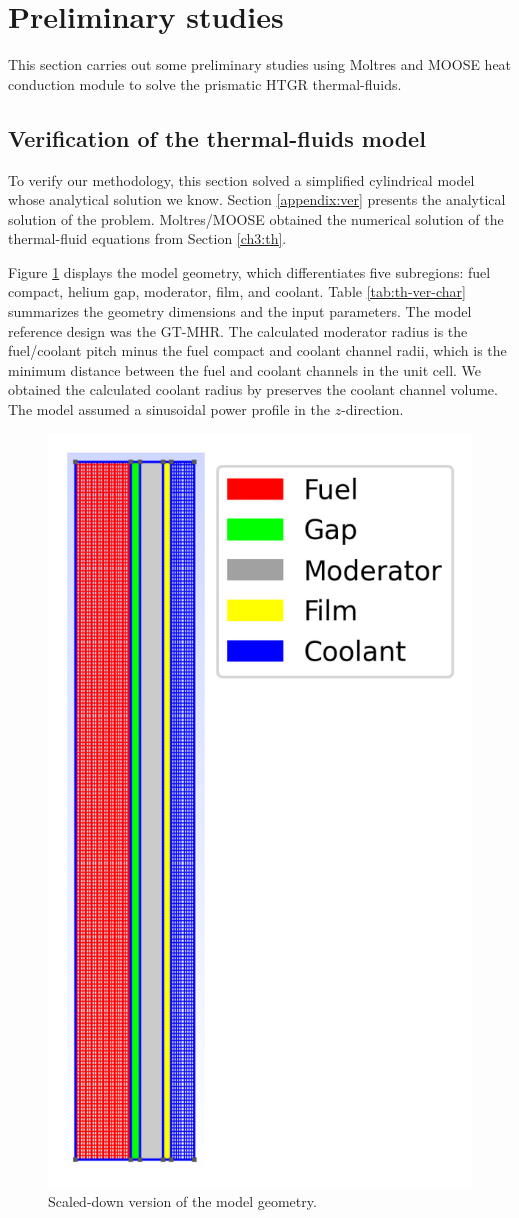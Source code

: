 \section{Preliminary studies}

This section carries out some preliminary studies using Moltres and MOOSE heat conduction module to solve the prismatic HTGR thermal-fluids.

\subsection{Verification of the thermal-fluids model}

To verify our methodology, this section solved a simplified cylindrical model whose analytical solution we know.
Section \ref{appendix:ver} presents the analytical solution of the problem.
Moltres/MOOSE obtained the numerical solution of the thermal-fluid equations from Section \ref{ch3:th}.

Figure \ref{fig:th-ver-mesh} displays the model geometry, which differentiates five subregions: fuel compact, helium gap, moderator, film, and coolant.
Table \ref{tab:th-ver-char} summarizes the geometry dimensions and the input parameters.
The model reference design was the GT-MHR.
The calculated moderator radius is the fuel/coolant pitch minus the fuel compact and coolant channel radii, which is the minimum distance between the fuel and coolant channels in the unit cell.
We obtained the calculated coolant radius by preserves the coolant channel volume.
The model assumed a sinusoidal power profile in the $z$-direction.

\begin{figure}[htbp!]
	\centering
	\includegraphics[width=0.25\linewidth]{figures-thermal/2D-preliminar-mesh2}
	\hfill
	\caption{Scaled-down version of the model geometry.}
	\label{fig:th-ver-mesh}
\end{figure}

